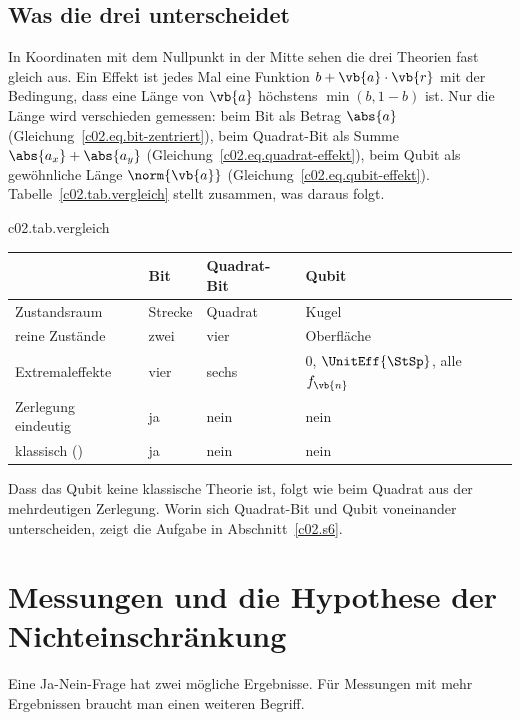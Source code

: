 \subsection{Was die drei unterscheidet}\label{c02.s4.4}

In Koordinaten mit dem Nullpunkt in der Mitte sehen die drei Theorien fast gleich aus. Ein
Effekt ist jedes Mal eine Funktion $b + \vb{a}\cdot\vb{r}$ mit der Bedingung, dass eine
Länge von $\vb{a}$ höchstens $\min(b, 1-b)$ ist. Nur die Länge wird verschieden gemessen:
beim Bit als Betrag $\abs{a}$ (Gleichung~\eqref{c02.eq.bit-zentriert}), beim Quadrat-Bit
als Summe $\abs{a_x} + \abs{a_y}$ (Gleichung~\eqref{c02.eq.quadrat-effekt}), beim Qubit als
gewöhnliche Länge $\norm{\vb{a}}$ (Gleichung~\eqref{c02.eq.qubit-effekt}).
Tabelle~\ref{c02.tab.vergleich} stellt zusammen, was daraus folgt.

\begin{tpctable}{c02.tab.vergleich}
  \caption{Die drei Theorien im Vergleich. Die Einträge sind die Ergebnisse der
    Propositionen~\ref{c02.prop.bit}, \ref{c02.prop.quadrat}, \ref{c02.prop.bloch} und
    \ref{c02.prop.qubit-effekte} sowie der Gleichungen~\eqref{c02.eq.bit} und
    \eqref{c02.eq.quadrat-mitte}.}
  \begin{tabular}{llll}
    \toprule
      & Bit & Quadrat-Bit & Qubit \\
    \midrule
    Zustandsraum & Strecke & Quadrat & Kugel \\
    reine Zustände & zwei & vier & Oberfläche \\
    Extremaleffekte & vier & sechs & $0$, $\UnitEff{\StSp}$, alle $f_{\vb{n}}$ \\
    Zerlegung eindeutig & ja & nein & nein \\
    klassisch ({D11}) & ja & nein & nein \\
    \bottomrule
  \end{tabular}
\end{tpctable}

Dass das Qubit keine klassische Theorie ist, folgt wie beim Quadrat aus der mehrdeutigen
Zerlegung. Worin sich Quadrat-Bit und Qubit voneinander unterscheiden, zeigt die Aufgabe in
Abschnitt~\ref{c02.s6}.

\section{Messungen und die Hypothese der Nichteinschränkung}\label{c02.s5}

Eine Ja-Nein-Frage hat zwei mögliche Ergebnisse. Für Messungen mit mehr Ergebnissen braucht
man einen weiteren Begriff.

